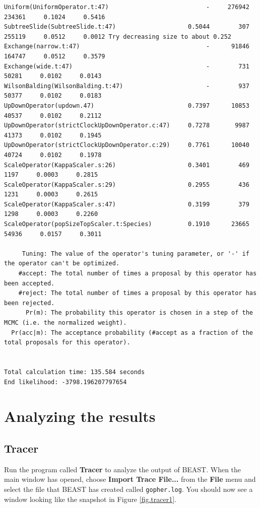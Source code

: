 \documentclass{article}
\begin{document}
{\begin{verbatim}
Uniform(UniformOperator.t:47)                           -     276942     234361     0.1024     0.5416 
SubtreeSlide(SubtreeSlide.t:47)                    0.5044        307     255119     0.0512     0.0012 Try decreasing size to about 0.252
Exchange(narrow.t:47)                                   -      91846     164747     0.0512     0.3579 
Exchange(wide.t:47)                                     -        731      50281     0.0102     0.0143 
WilsonBalding(WilsonBalding.t:47)                       -        937      50377     0.0102     0.0183 
UpDownOperator(updown.47)                          0.7397      10853      40537     0.0102     0.2112 
UpDownOperator(strictClockUpDownOperator.c:47)     0.7278       9987      41373     0.0102     0.1945 
UpDownOperator(strictClockUpDownOperator.c:29)     0.7761      10040      40724     0.0102     0.1978 
ScaleOperator(KappaScaler.s:26)                    0.3401        469       1197     0.0003     0.2815 
ScaleOperator(KappaScaler.s:29)                    0.2955        436       1231     0.0003     0.2615 
ScaleOperator(KappaScaler.s:47)                    0.3199        379       1298     0.0003     0.2260 
ScaleOperator(popSizeTopScaler.t:Species)          0.1910      23665      54936     0.0157     0.3011 

     Tuning: The value of the operator's tuning parameter, or '-' if the operator can't be optimized.
    #accept: The total number of times a proposal by this operator has been accepted.
    #reject: The total number of times a proposal by this operator has been rejected.
      Pr(m): The probability this operator is chosen in a step of the MCMC (i.e. the normalized weight).
  Pr(acc|m): The acceptance probability (#accept as a fraction of the total proposals for this operator).


Total calculation time: 135.584 seconds
End likelihood: -3798.196207797654
\end{verbatim}}

\section{Analyzing the results}

\subsection{Tracer}

Run the program called {\bf Tracer} to analyze the output of BEAST. When the main
window has opened, choose {\bf Import Trace File...} from the {\bf File} menu and select the file that
BEAST has created called \texttt{gopher.log}.
You should now see a window looking like the snapshot in Figure \ref{fig.tracer1}.
\end{document}

